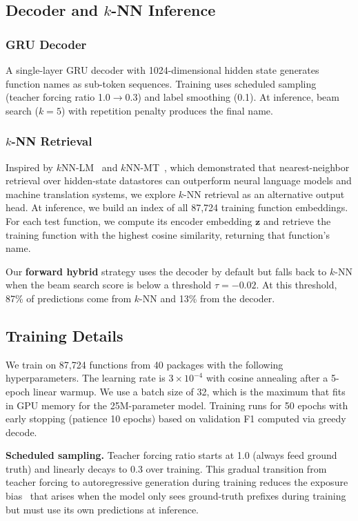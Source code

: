 \documentclass[sigconf,nonacm]{acmart}
\begin{document}
\subsection{Decoder and $k$-NN Inference}
\label{sec:decoder}

\subsubsection{GRU Decoder}
A single-layer GRU decoder with 1024-dimensional hidden state generates function names as sub-token sequences. Training uses scheduled sampling (teacher forcing ratio 1.0$\to$0.3) and label smoothing (0.1). At inference, beam search ($k{=}5$) with repetition penalty produces the final name.

\subsubsection{$k$-NN Retrieval}
\label{sec:knn}
Inspired by $k$NN-LM~\cite{knnlm} and $k$NN-MT~\cite{knnmt}, which demonstrated that nearest-neighbor retrieval over hidden-state datastores can outperform neural language models and machine translation systems, we explore $k$-NN retrieval as an alternative output head. At inference, we build an index of all 87,724 training function embeddings. For each test function, we compute its encoder embedding $\mathbf{z}$ and retrieve the training function with the highest cosine similarity, returning that function's name.

Our \textbf{forward hybrid} strategy uses the decoder by default but falls back to $k$-NN when the beam search score is below a threshold $\tau{=}{-}0.02$. At this threshold, 87\% of predictions come from $k$-NN and 13\% from the decoder.

\subsection{Training Details}
\label{sec:training}

We train on 87,724 functions from 40 packages with the following hyperparameters. The learning rate is $3 \times 10^{-4}$ with cosine annealing after a 5-epoch linear warmup. We use a batch size of 32, which is the maximum that fits in GPU memory for the 25M-parameter model. Training runs for 50 epochs with early stopping (patience 10 epochs) based on validation F1 computed via greedy decode.

\textbf{Scheduled sampling.} Teacher forcing ratio starts at 1.0 (always feed ground truth) and linearly decays to 0.3 over training. This gradual transition from teacher forcing to autoregressive generation during training reduces the exposure bias~\cite{bengio2015scheduled} that arises when the model only sees ground-truth prefixes during training but must use its own predictions at inference.
\end{document}
